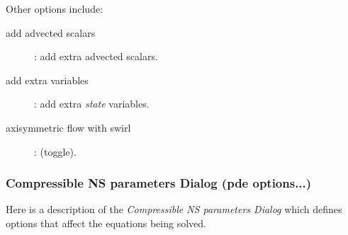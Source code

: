 \documentclass{article}
\newcommand{\bogus}[1]{}  %
\begin{document}
% 

% 
\noindent Other options include:
\begin{description}
  \item[\qquad add advected scalars] : add extra advected scalars.
  \item[\qquad add extra variables] : add extra {\em state} variables. 
  \item[\qquad axisymmetric flow with swirl] : (toggle).
\end{description}




\bogus{
\noindent The {\em } options are
\begin{description}
  \item[\qquad ] : 
\end{description}
}

\subsubsection{Compressible NS parameters Dialog (pde options...)}\label{sec:pdeOptions}

Here is a description of the {\em Compressible NS parameters Dialog} which defines
options that affect the equations being solved.

\end{document}

